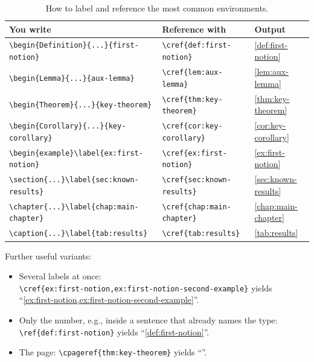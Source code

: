 \begin{table}[H]
    \centering
    \caption{How to label and reference the most common environments.}
    \label{tab:cross-references}
    \begin{tabular}{lll}
        \toprule
        \textbf{You write} & \textbf{Reference with} & \textbf{Output} \\
        \midrule
        \lstinline|\begin{Definition}{...}{first-notion}| & \lstinline|\cref{def:first-notion}| & \cref{def:first-notion} \\
        \lstinline|\begin{Lemma}{...}{aux-lemma}|          & \lstinline|\cref{lem:aux-lemma}|    & \cref{lem:aux-lemma} \\
        \lstinline|\begin{Theorem}{...}{key-theorem}|      & \lstinline|\cref{thm:key-theorem}|  & \cref{thm:key-theorem} \\
        \lstinline|\begin{Corollary}{...}{key-corollary}|  & \lstinline|\cref{cor:key-corollary}| & \cref{cor:key-corollary} \\
        \lstinline|\begin{example}\label{ex:first-notion}| & \lstinline|\cref{ex:first-notion}|  & \cref{ex:first-notion} \\
        \lstinline|\section{...}\label{sec:known-results}| & \lstinline|\cref{sec:known-results}| & \cref{sec:known-results} \\
        \lstinline|\chapter{...}\label{chap:main-chapter}| & \lstinline|\cref{chap:main-chapter}| & \cref{chap:main-chapter} \\
        \lstinline|\caption{...}\label{tab:results}|       & \lstinline|\cref{tab:results}|      & \cref{tab:results} \\
        \bottomrule
    \end{tabular}
\end{table}

Further useful variants:
\begin{itemize}
    \item Several labels at once:\\
          \lstinline|\cref{ex:first-notion,ex:first-notion-second-example}|
          yields ``\cref{ex:first-notion,ex:first-notion-second-example}''.
    \item Only the number, e.g., inside a sentence that already names the type:\\
          \lstinline|\ref{def:first-notion}| yields ``\ref{def:first-notion}''.
    \item The page: \lstinline|\cpageref{thm:key-theorem}| yields
          ``''.
\end{itemize}


